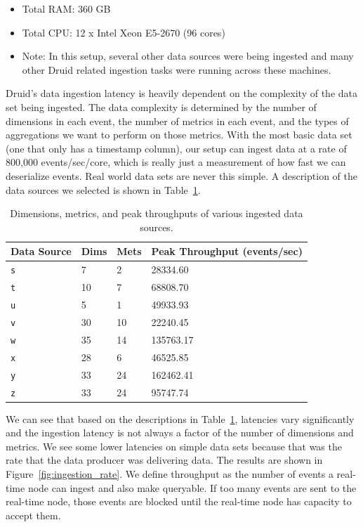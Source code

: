 \documentclass{acm_proc_article-sp}
\begin{document}
\begin{itemize}
\item Total RAM: 360 GB 
\item Total CPU: 12 x Intel Xeon E5-2670 (96 cores)
\item Note: In this setup, several other data sources were being ingested and many other Druid related ingestion tasks were running across these machines.
\end{itemize}

Druid's data ingestion latency is heavily dependent on the complexity of the
data set being ingested. The data complexity is determined by the number of
dimensions in each event, the number of metrics in each event, and the types of
aggregations we want to perform on those metrics. With the most basic data set
(one that only has a timestamp column), our setup can ingest data at a rate of
800,000 events/sec/core, which is really just a measurement of how fast we can
deserialize events. Real world data sets are never this simple. A description
of the data sources we selected is shown in Table~\ref{tab:ingest_datasources}. 

\begin{table}
  \centering
  \caption{Dimensions, metrics, and peak throughputs of various ingested data sources.}
  \label{tab:ingest_datasources}
  \begin{tabular}{| l | l | l | l |}
    \hline
    \textbf{Data Source} & \textbf{Dims} & \textbf{Mets} & \textbf{Peak Throughput (events/sec)} \\ \hline
    \texttt{s} & 7 & 2 & 28334.60 \\ \hline
    \texttt{t} & 10 & 7 & 68808.70 \\ \hline
    \texttt{u} & 5 & 1 & 49933.93 \\ \hline
    \texttt{v} & 30 & 10 & 22240.45 \\ \hline
    \texttt{w} & 35 & 14 & 135763.17 \\ \hline
    \texttt{x} & 28 & 6 & 46525.85 \\ \hline
    \texttt{y} & 33 & 24 & 162462.41 \\ \hline
    \texttt{z} & 33 & 24 & 95747.74 \\ \hline
  \end{tabular}
\end{table}

We can see that based on the descriptions in
Table~\ref{tab:ingest_datasources}, latencies vary significantly and the
ingestion latency is not always a factor of the number of dimensions and
metrics. We see some lower latencies on simple data sets because that was the
rate that the data producer was delivering data. The results are shown in
Figure~\ref{fig:ingestion_rate}. We define throughput as the number of events a
real-time node can ingest and also make queryable. If too many events are sent
to the real-time node, those events are blocked until the real-time node has
capacity to accept them.
\end{document}
